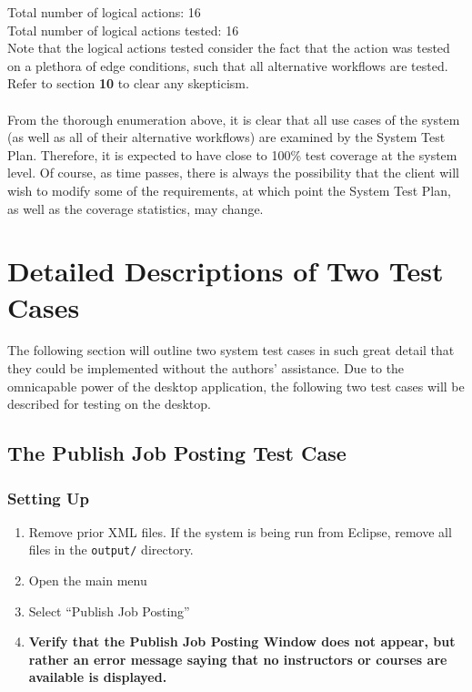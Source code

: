 \documentclass[12pt]{report}
\begin{document}
Total number of logical actions: 16\\
Total number of logical actions tested: 16\\
Note that the logical actions tested consider the fact that the action was tested on a plethora of
edge conditions, such that all alternative workflows are tested. Refer to section \textbf{10} to
clear any skepticism.\\\\
From the thorough enumeration above, it is clear that all use cases of the system (as well as all of
their alternative workflows) are examined by the System Test Plan. Therefore, it is expected to have
close to 100\% test coverage at the system level. Of course, as time passes, there is always the
possibility that the client will wish to modify some of the requirements, at which point the System
Test Plan, as well as the coverage statistics, may change.

\section{Detailed Descriptions of Two Test Cases}
The following section will outline two system test cases in such great detail that they could be
implemented without the authors' assistance. Due to the omnicapable power of the desktop
application, the following two test cases will be described for testing on the desktop.
\subsection{The Publish Job Posting Test Case}
\subsubsection{Setting Up}
\begin{enumerate}
	\item Remove prior XML files. If the system is being run from Eclipse, remove all files in the
		\texttt{output/} directory.
	\item Open the main menu
	\item Select ``Publish Job Posting''
	\item \textbf{Verify that the Publish Job Posting Window does not appear, but rather an error
		message saying that no instructors or courses are available is displayed.}
\end{enumerate}
\end{document}
